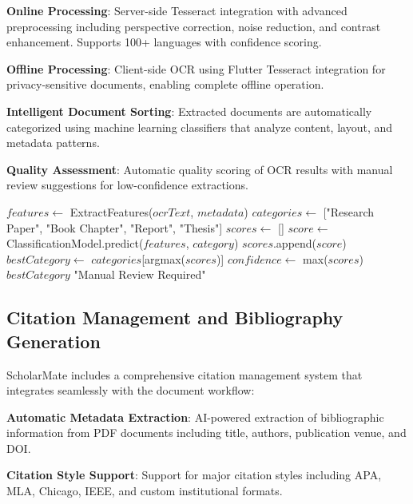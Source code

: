 \documentclass[conference]{IEEEtran}
\begin{document}
\textbf{Online Processing}: Server-side Tesseract integration with advanced preprocessing including perspective correction, noise reduction, and contrast enhancement. Supports 100+ languages with confidence scoring.

\textbf{Offline Processing}: Client-side OCR using Flutter Tesseract integration for privacy-sensitive documents, enabling complete offline operation.

\textbf{Intelligent Document Sorting}: Extracted documents are automatically categorized using machine learning classifiers that analyze content, layout, and metadata patterns.

\textbf{Quality Assessment}: Automatic quality scoring of OCR results with manual review suggestions for low-confidence extractions.

\begin{algorithm}[htbp]
\caption{Intelligent Document Classification}
\begin{algorithmic}[1]
    \State $features \gets$ ExtractFeatures($ocrText$, $metadata$)
    \State $categories \gets$ ["Research Paper", "Book Chapter", "Report", "Thesis"]
    \State $scores \gets$ []
        \State $score \gets$ ClassificationModel.predict($features$, $category$)
        \State $scores$.append($score$)
    \EndFor
    \State $bestCategory \gets$ $categories$[argmax($scores$)]
    \State $confidence \gets$ max($scores$)
        \State \Return $bestCategory$
    \Else
        \State \Return "Manual Review Required"
    \EndIf
\EndProcedure
\end{algorithmic}
\end{algorithm}

\subsection{Citation Management and Bibliography Generation}

ScholarMate includes a comprehensive citation management system that integrates seamlessly with the document workflow:

\textbf{Automatic Metadata Extraction}: AI-powered extraction of bibliographic information from PDF documents including title, authors, publication venue, and DOI.

\textbf{Citation Style Support}: Support for major citation styles including APA, MLA, Chicago, IEEE, and custom institutional formats.
\end{document}
